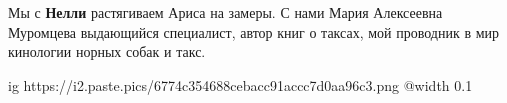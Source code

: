  
 
 
 
 


Мы с \textbf{Нелли} растягиваем Ариса на замеры. С нами Мария Алексеевна
Муромцева выдающийся специалист, автор книг о таксах, мой проводник в мир
кинологии норных собак и такс.


\ifcmt
  ig https://i2.paste.pics/6774c354688cebacc91accc7d0aa96c3.png
  @width 0.1
\fi
